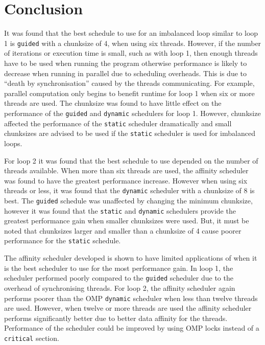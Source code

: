 \documentclass[11pt, a4paper]{article}
\begin{document}
	\section{Conclusion}
		It was found that the best schedule to use for an imbalanced loop similar to loop 1 is \texttt{guided} with a chunksize of 4, when using six threads. However, if the number of iterations or execution time is small, such as with loop 1, then enough threads have to be used when running the program otherwise performance is likely to decrease when running in parallel due to scheduling overheads. This is due to ``death by synchronisation'' caused by the threads communicating. For example, parallel computation only begins to benefit runtime for loop 1 when six or more threads are used. The chunksize was found to have little effect on the performance of the \texttt{guided} and \texttt{dynamic} schedulers for loop 1. However, chunksize affected the performance of the \texttt{static} scheduler dramatically and small chunksizes are advised to be used if the \texttt{static} scheduler is used for imbalanced loops.
		
		For loop 2 it was found that the best schedule to use depended on the number of threads available. When more than six threads are used, the affinity scheduler was found to have the greatest performance increase. However when using six threads or less, it was found that the \texttt{dynamic} scheduler with a chunksize of 8 is best. The \texttt{guided} schedule was unaffected by changing the minimum chunksize, however it was found that the \texttt{static} and \texttt{dynamic} schedulers provide the greatest performance gain when smaller chunksizes were used. But, it must be noted that chunksizes larger and smaller than a chunksize of 4 cause poorer performance for the \texttt{static} schedule. 
		
		The affinity scheduler developed is shown to have limited applications of when it is the best scheduler to use for the most performance gain. In loop 1, the scheduler performed poorly compared to the \texttt{guided} scheduler due to the overhead of synchronising threads. For loop 2, the affinity scheduler again performs poorer than the OMP \texttt{dynamic} scheduler when less than twelve threads are used. However, when twelve or more threads are used the affinity scheduler performs significantly better due to better data affinity for the threads. Performance of the scheduler could be improved by using OMP locks instead of a \texttt{critical} section.
		
	\newpage
\end{document}
